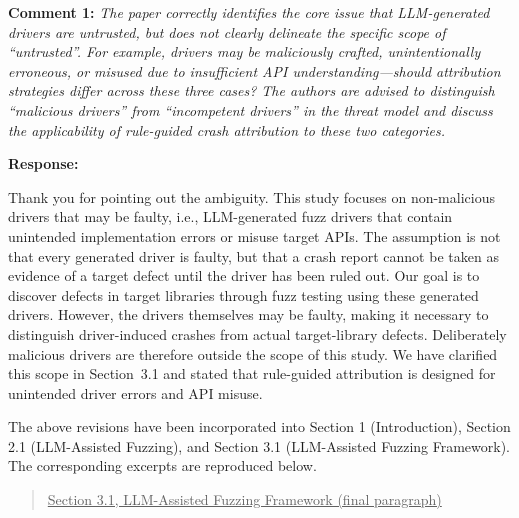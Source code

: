 \documentclass[onecolumn,11pt]{article}
\newcommand{\secc}[2]{\par\mySep \noindent \textsf{\textbf{#1 }}\textit{#2}\par}
\newcommand{\secr}[2]{\par\mySep \noindent \textsf{\textbf{#1 }}{#2}\par}
\newcommand{\nc}[2]{\needspace{5\baselineskip}\begin{quote}\underline{#1}\\ \nopagebreak[4]{\leavevmode\color{blue}{``#2"}}\end{quote}}
\newcommand{\mySep}{\vspace{8pt}}
\begin{document}
\secc{Comment 1:}{The paper correctly identifies the core issue that LLM-generated drivers are untrusted, but does not clearly delineate the specific scope of ``untrusted''. For example, drivers may be maliciously crafted, unintentionally erroneous, or misused due to insufficient API understanding---should attribution strategies differ across these three cases? The authors are advised to distinguish ``malicious drivers'' from ``incompetent drivers'' in the threat model and discuss the applicability of rule-guided crash attribution to these two categories.}
\secr{Response:}{Thank you for pointing out the ambiguity. This study focuses on non-malicious drivers that may be faulty, i.e., LLM-generated fuzz drivers that contain unintended implementation errors or misuse target APIs. The assumption is not that every generated driver is faulty, but that a crash report cannot be taken as evidence of a target defect until the driver has been ruled out. Our goal is to discover defects in target libraries through fuzz testing using these generated drivers. However, the drivers themselves may be faulty, making it necessary to distinguish driver-induced crashes from actual target-library defects. Deliberately malicious drivers are therefore outside the scope of this study. We have clarified this scope in Section~3.1 and stated that rule-guided attribution is designed for unintended driver errors and API misuse.

The above revisions have been incorporated into Section 1 (Introduction), Section 2.1 (LLM-Assisted Fuzzing), and Section 3.1 (LLM-Assisted Fuzzing Framework). The corresponding excerpts are reproduced below.}

\nc{Section 3.1, LLM-Assisted Fuzzing Framework (final paragraph)}{In the workflow described above, generated drivers are assumed to be non-malicious but potentially faulty: they may contain unintentional implementation errors or may misuse the target APIs, and we refer to such a driver as an incompetent driver. The assumption is not that every generated driver is faulty, but that a crash report cannot be taken as evidence of a target defect until the driver has been ruled out. A faulty driver may omit required initialization, construct invalid arguments, or otherwise violate API contracts because of unintentional generation errors or insufficient API understanding. We assume that the sanitizer reports, crash artifacts, and source code used for analysis have not been deliberately tampered with. Under these assumptions, rule-guided crash attribution uses sanitizer signals and stack-frame roles to screen likely driver-induced failures. Deliberately malicious drivers, including those that forge evidence or attempt to evade adjudication, are outside the scope of this work.}
\end{document}
